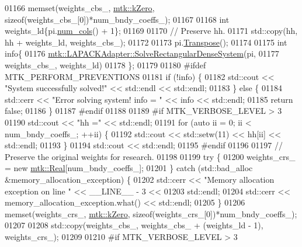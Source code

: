 \begin{DoxyCode}
{{01166   memset(weights\_cbs\_, \hyperlink{group__c01-roots_ga59a451a5fae30d59649bcda274fea271}{mtk::kZero}, \textcolor{keyword}{sizeof}(weights\_cbs\_[0])*num\_bndy\_coeffs\_);
01167 
01168   \textcolor{keywordtype}{int} weights\_ld\{pi.\hyperlink{classmtk_1_1DenseMatrix_a41747502d468c6728a4be31501b16e0e}{num\_cols}() + 1\};
01169 
01170   \textcolor{comment}{// Preserve hh.}
01171   std::copy(hh, hh + weights\_ld, weights\_cbs\_);
01172 
01173   pi.\hyperlink{classmtk_1_1DenseMatrix_a71d9c07ca66e88d97d1fd5012f43138b}{Transpose}();
01174 
01175   \textcolor{keywordtype}{int} info\{
01176     \hyperlink{classmtk_1_1LAPACKAdapter_a380f148ffdf96bae2f79ae28f1a6560c}{mtk::LAPACKAdapter::SolveRectangularDenseSystem}(pi,
01177                                                     weights\_cbs\_, weights\_ld)
01178   \};
01179 
01180 \textcolor{preprocessor}{  #ifdef MTK\_PERFORM\_PREVENTIONS}
01181   \textcolor{keywordflow}{if} (!info) \{
01182     std::cout << \textcolor{stringliteral}{"System successfully solved!"} << std::endl << std::endl;
01183   \} \textcolor{keywordflow}{else} \{
01184     std::cerr << \textcolor{stringliteral}{"Error solving system! info = "} << info << std::endl;
01185     \textcolor{keywordflow}{return} \textcolor{keyword}{false};
01186   \}
01187 \textcolor{preprocessor}{  #endif}
01188 
01189 \textcolor{preprocessor}{  #if MTK\_VERBOSE\_LEVEL > 3}
01190   std::cout << \textcolor{stringliteral}{"hh ="} << std::endl;
01191   \textcolor{keywordflow}{for} (\textcolor{keyword}{auto} ii = 0; ii < num\_bndy\_coeffs\_; ++ii) \{
01192     std::cout << std::setw(11) << hh[ii] << std::endl;
01193   \}
01194   std::cout << std::endl;
01195 \textcolor{preprocessor}{  #endif}
01196 
01197   \textcolor{comment}{// Preserve the original weights for research.}
01198 
01199   \textcolor{keywordflow}{try} \{
01200     weights\_crs\_ = \textcolor{keyword}{new} \hyperlink{group__c01-roots_gac080bbbf5cbb5502c9f00405f894857d}{mtk::Real}[num\_bndy\_coeffs\_];
01201   \} \textcolor{keywordflow}{catch} (std::bad\_alloc &memory\_allocation\_exception) \{
01202     std::cerr << \textcolor{stringliteral}{"Memory allocation exception on line "} << \_\_LINE\_\_ - 3 <<
01203       std::endl;
01204     std::cerr << memory\_allocation\_exception.what() << std::endl;
01205   \}
01206   memset(weights\_crs\_, \hyperlink{group__c01-roots_ga59a451a5fae30d59649bcda274fea271}{mtk::kZero}, \textcolor{keyword}{sizeof}(weights\_crs\_[0])*num\_bndy\_coeffs\_);
01207 
01208   std::copy(weights\_cbs\_, weights\_cbs\_ + (weights\_ld - 1), weights\_crs\_);
01209 
01210 \textcolor{preprocessor}{  #if MTK\_VERBOSE\_LEVEL > 3}
}}
\end{DoxyCode}
